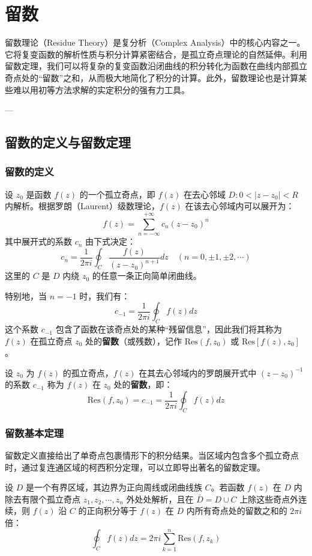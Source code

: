 \chapter{留数}

留数理论（Residue Theory）是复分析（Complex Analysis）中的核心内容之一。它将复变函数的解析性质与积分计算紧密结合，是孤立奇点理论的自然延伸。利用留数定理，我们可以将复杂的复变函数沿闭曲线的积分转化为函数在曲线内部孤立奇点处的“留数”之和，从而极大地简化了积分的计算。此外，留数理论也是计算某些难以用初等方法求解的实定积分的强有力工具。

---

\section{留数的定义与留数定理}

\subsection{留数的定义}
设 $z_0$ 是函数 $f(z)$ 的一个孤立奇点，即 $f(z)$ 在去心邻域 $D: 0 < |z - z_0| < R$ 内解析。根据罗朗（Laurent）级数理论，$f(z)$ 在该去心邻域内可以展开为：
$$ f(z) = \sum_{n=-\infty}^{+\infty} c_n (z - z_0)^n $$
其中展开式的系数 $c_n$ 由下式决定：
$$ c_n = \frac{1}{2\pi i} \oint_{C} \frac{f(z)}{(z - z_0)^{n+1}} dz \quad (n = 0, \pm 1, \pm 2, \cdots) $$
这里的 $C$ 是 $D$ 内绕 $z_0$ 的任意一条正向简单闭曲线。

特别地，当 $n = -1$ 时，我们有：
$$ c_{-1} = \frac{1}{2\pi i} \oint_{C} f(z) dz $$
这个系数 $c_{-1}$ 包含了函数在该奇点处的某种“残留信息”，因此我们将其称为 $f(z)$ 在孤立奇点 $z_0$ 处的\textbf{留数}（或残数），记作 $\text{Res}(f, z_0)$ 或 $\text{Res}[f(z), z_0]$。

\begin{definition}[留数]
	设 $z_0$ 为 $f(z)$ 的孤立奇点，$f(z)$ 在其去心邻域内的罗朗展开式中 $(z-z_0)^{-1}$ 的系数 $c_{-1}$ 称为 $f(z)$ 在 $z_0$ 处的\textbf{留数}，即：
	$$ \text{Res}(f, z_0) = c_{-1} = \frac{1}{2\pi i} \oint_{C} f(z) dz $$
\end{definition}

\subsection{留数基本定理}
留数定义直接给出了单奇点包裹情形下的积分结果。当区域内包含多个孤立奇点时，通过复连通区域的柯西积分定理，可以立即导出著名的留数定理。

\begin{theorem}[柯西留数定理]
	设 $D$ 是一个有界区域，其边界为正向周线或闭曲线族 $C$。若函数 $f(z)$ 在 $D$ 内除去有限个孤立奇点 $z_1, z_2, \cdots, z_n$ 外处处解析，且在 $\bar{D} = D \cup C$ 上除这些奇点外连续，则 $f(z)$ 沿 $C$ 的正向积分等于 $f(z)$ 在 $D$ 内所有奇点处的留数之和的 $2\pi i$ 倍：
	$$ \oint_{C} f(z) dz = 2\pi i \sum_{k=1}^{n} \text{Res}(f, z_k) $$
\end{theorem}

